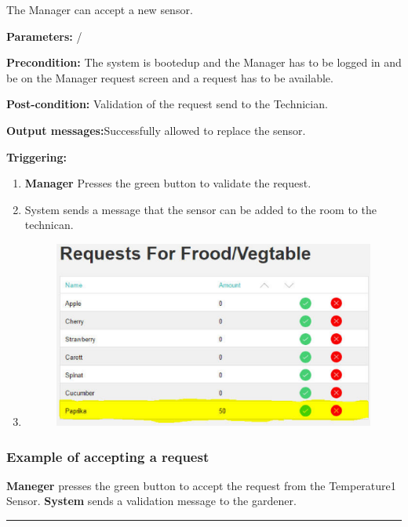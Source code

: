 The Manager can accept a new sensor.
\begin{description}
\item \textbf{Parameters:} /
\item \textbf{Precondition:} The system is bootedup and the Manager has to be
logged in and be on the Manager request screen and a request has to be
available.
\item \textbf{Post-condition:} Validation of the request send to the Technician.
\item \textbf{Output messages:}Successfully allowed to replace the sensor.
\item \textbf{Triggering:}
\begin{enumerate}
\item \textbf{Manager} Presses the green button to validate the request.
\item System sends a message that the sensor can be added to the room to the
technican.
\item \begin{figure}[H]
\includegraphics[width=1\textwidth]{images/AcceptRequestedCropManager.eps}
\end{figure}
\end{enumerate}
\end{description}

\subsubsection{Example of accepting a request}
\textbf{Maneger} presses the green button to accept the request from the
Temperature1 Sensor. \textbf{System} sends a validation message to the gardener.
\hfill
\vspace{0.5cm}
\hrule






